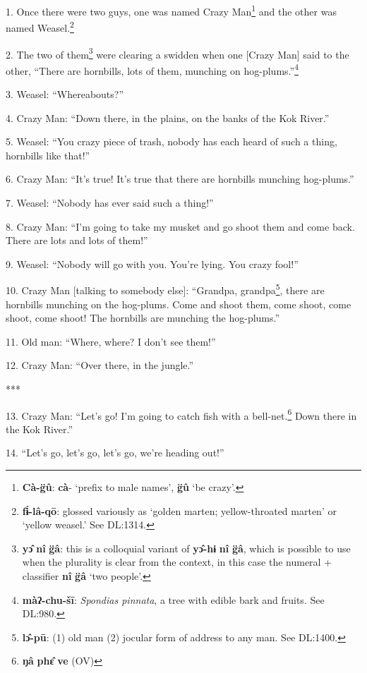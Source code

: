 \setcounter{footnote}{0}

1. Once there were two guys, one was named Crazy Man\footnote{\textbf{Cà-g̈û}: \textbf{cà}- `prefix to male names', \textbf{g̈û} `be crazy'.} and the other was named
Weasel.\footnote{\textbf{fɨ́-lâ-qō}: glossed variously as `golden marten; yellow-throated marten' or `yellow weasel.' See DL:1314.}

2. The two of them\footnote{\textbf{yɔ̂} \textbf{nî} \textbf{g̈â}: this is a colloquial variant of \textbf{yɔ̂-hɨ} \textbf{nî} \textbf{g̈â}, which is possible to use when the plurality is clear from the context, in this case the numeral + classifier \textbf{nî} \textbf{g̈â} `two people'.} were clearing a swidden when one [Crazy Man] said to the
other, ``There are hornbills, lots of them, munching on hog-plums.''\footnote{\textbf{màʔ-chu-šī}: \textit{Spondias pinnata}, a tree with edible bark and fruits. See DL:980.}

3. Weasel: ``Whereabouts?''

4. Crazy Man: ``Down there, in the plains, on the banks of the Kok River.''

5. Weasel: ``You crazy piece of trash, nobody has each heard of such a thing, hornbills
like that!''

6. Crazy Man: ``It's true! It's true that there are hornbills munching hog-plums.''

7. Weasel: ``Nobody has ever said such a thing!''

8. Crazy Man: ``I'm going to take my musket and go shoot them and come back. There
are lots and lots of them!''

9. Weasel: ``Nobody will go with you. You're lying. You crazy fool!''

10. Crazy Man [talking to somebody else]: ``Grandpa, grandpa\footnote{\textbf{lɔ̂-pū}: (1) old man (2) jocular form of address to any man. See DL:1400.}, there are hornbills
munching on the hog-plums. Come and shoot them, come shoot, come shoot, come shoot!
The hornbills are munching the hog-plums.''

11. Old man: ``Where, where? I don't see them!''

12. Crazy Man: ``Over there, in the jungle.''

***

13. Crazy Man: ``Let's go! I'm going to catch fish with a bell-net.\footnote{\textbf{ŋâ} \textbf{phɛ̂} \textbf{ve} (OV)} Down there
in the Kok River.''

14. ``Let's go, let's go, let's go, we're heading out!''

